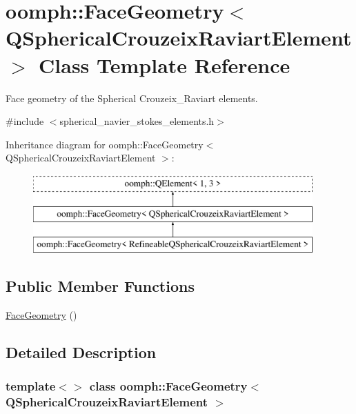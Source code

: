 \hypertarget{classoomph_1_1FaceGeometry_3_01QSphericalCrouzeixRaviartElement_01_4}{}\section{oomph\+:\+:Face\+Geometry$<$ Q\+Spherical\+Crouzeix\+Raviart\+Element $>$ Class Template Reference}
\label{classoomph_1_1FaceGeometry_3_01QSphericalCrouzeixRaviartElement_01_4}


Face geometry of the Spherical Crouzeix\+\_\+\+Raviart elements.  




{\ttfamily \#include $<$spherical\+\_\+navier\+\_\+stokes\+\_\+elements.\+h$>$}

Inheritance diagram for oomph\+:\+:Face\+Geometry$<$ Q\+Spherical\+Crouzeix\+Raviart\+Element $>$\+:\begin{figure}[H]
\begin{center}
\leavevmode
\includegraphics[height=3.000000cm]{classoomph_1_1FaceGeometry_3_01QSphericalCrouzeixRaviartElement_01_4}
\end{center}
\end{figure}
\subsection*{Public Member Functions}
\begin{DoxyCompactItemize}
\item 
\hyperlink{classoomph_1_1FaceGeometry_3_01QSphericalCrouzeixRaviartElement_01_4_abbe5e50ccb305d9be8efba383323eff0}{Face\+Geometry} ()
\end{DoxyCompactItemize}


\subsection{Detailed Description}
\subsubsection*{template$<$$>$\newline
class oomph\+::\+Face\+Geometry$<$ Q\+Spherical\+Crouzeix\+Raviart\+Element $>$}

